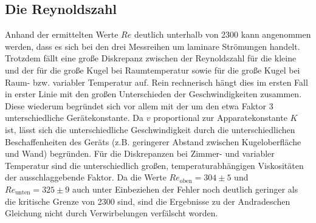 \subsection[]{Die Reynoldszahl}
Anhand der ermittelten Werte $Re$ deutlich unterhalb von 2300 kann angenommen werden, dass es sich bei den drei Messreihen um laminare Strömungen handelt.
Trotzdem fällt eine große Diskrepanz zwischen der Reynoldszahl für die kleine und der für die große Kugel bei Raumtemperatur
sowie für die große Kugel bei Raum- bzw. variabler Temperatur auf.
Rein rechnerisch hängt dies im ersten Fall in erster Linie mit den großen Unterschieden der Geschwindigkeiten zusammen.
Diese wiederum begründet sich vor allem mit der um den etwa Faktor 3 unterschiedliche Gerätekonstante.
Da $v$ proportional zur Apparatekonstante $K$ ist, lässt sich die unterschiedliche Geschwindigkeit 
durch die unterschiedlichen Beschaffenheiten des Geräts (z.B. geringerer Abstand zwischen Kugeloberfläche und Wand) begründen.
Für die Diskrepanzen bei Zimmer- und variabler Temperatur sind die unterschiedlich großen, temperaturabhängigen Viskositäten der ausschlaggebende Faktor.
Da die Werte $Re_\text{oben} = 304 \pm 5$ und $Re_\text{unten} = 325 \pm 9$ auch unter Einbeziehen der Fehler noch deutlich geringer als die kritische
Grenze von 2300 sind, sind die Ergebnisse zu der Andradeschen Gleichung nicht durch Verwirbelungen verfälscht worden.







